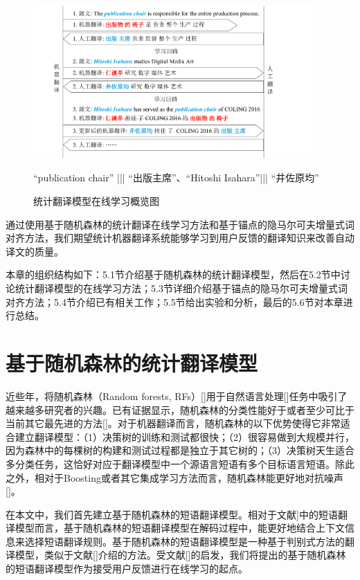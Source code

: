 \begin{figure}[!tb]
	\centering
	\includegraphics[width=0.95\textwidth]{Figure/Figure_5_1.pdf}
	
	
	“publication chair” ||| “出版主席”、“Hitoshi Isahara”||| “井佐原均”
	\caption{统计翻译模型在线学习概览图}
	\label{Fig_online_overview}
\end{figure}

通过使用基于随机森林的统计翻译在线学习方法和基于锚点的隐马尔可夫增量式词对齐方法，我们期望统计机器翻译系统能够学习到用户反馈的翻译知识来改善自动译文的质量。

本章的组织结构如下：5.1节介绍基于随机森林的统计翻译模型，然后在5.2节中讨论统计翻译模型的在线学习方法；5.3节详细介绍基于锚点的隐马尔可夫增量式词对齐方法；5.4节介绍已有相关工作；5.5节给出实验和分析，最后的5.6节对本章进行总结。

\section{基于随机森林的统计翻译模型}

近些年，将随机森林（Random forests, RFs）[\cite{Breiman:2001}]用于自然语言处理[\cite{Xu:2004}]任务中吸引了越来越多研究者的兴趣。已有证据显示，随机森林的分类性能好于或者至少可比于当前其它最先进的方法[\cite{Breiman:2001,Bosch:2007}]。对于机器翻译而言，随机森林的以下优势使得它非常适合建立翻译模型：（1）决策树的训练和测试都很快；（2）很容易做到大规模并行，因为森林中的每棵树的构建和测试过程都是独立于其它树的；（3）决策树天生适合多分类任务，这恰好对应于翻译模型中一个源语言短语有多个目标语言短语。除此之外，相对于Boosting或者其它集成学习方法而言，随机森林能更好地对抗噪声[\cite{Breiman:2001}]。

在本文中，我们首先建立基于随机森林的短语翻译模型。相对于文献\cite{Koehn:2003}]中的短语翻译模型而言，基于随机森林的短语翻译模型在解码过程中，能更好地结合上下文信息来选择短语翻译规则。基于随机森林的短语翻译模型是一种基于判别式方法的翻译模型，类似于文献[\cite{He:2008,LiuQun:2008}]介绍的方法。受文献[\cite{Saffari:2009}]的启发，我们将提出的基于随机森林的短语翻译模型作为接受用户反馈进行在线学习的起点。

